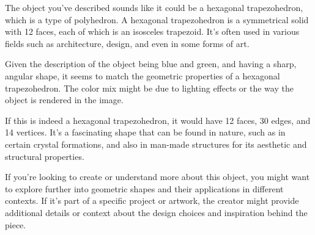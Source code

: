 The object you've described sounds like it could be a hexagonal trapezohedron, which is a type of polyhedron. A hexagonal trapezohedron is a symmetrical solid with 12 faces, each of which is an isosceles trapezoid. It's often used in various fields such as architecture, design, and even in some forms of art.

Given the description of the object being blue and green, and having a sharp, angular shape, it seems to match the geometric properties of a hexagonal trapezohedron. The color mix might be due to lighting effects or the way the object is rendered in the image.

If this is indeed a hexagonal trapezohedron, it would have 12 faces, 30 edges, and 14 vertices. It's a fascinating shape that can be found in nature, such as in certain crystal formations, and also in man-made structures for its aesthetic and structural properties.

If you're looking to create or understand more about this object, you might want to explore further into geometric shapes and their applications in different contexts. If it's part of a specific project or artwork, the creator might provide additional details or context about the design choices and inspiration behind the piece.